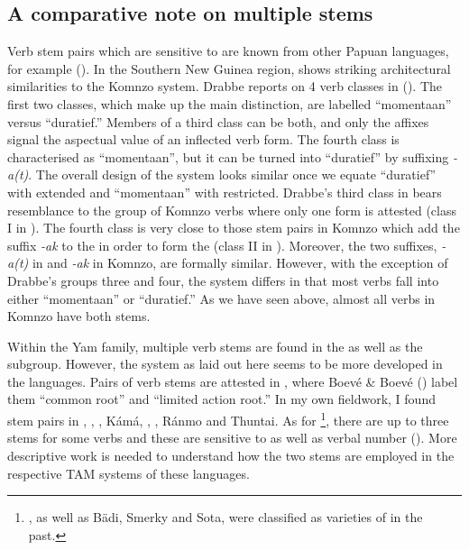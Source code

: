 \subsection{A comparative note on multiple stems} \label{comparativenoteextrs}

Verb stem pairs which are sensitive to  are known from other Papuan languages, for example  (\citealt[245]{Fedden:2011wu}). In the Southern New Guinea region,  shows striking architectural similarities to the Komnzo system. Drabbe reports on 4 verb classes in  (\citeyear[31]{Drabbe:1955tm}). The first two classes, which make up the main distinction, are labelled ``momentaan'' versus ``duratief.'' Members of a third class can be both, and only the affixes signal the aspectual value of an inflected verb form. The fourth class is characterised as ``momentaan'', but it can be turned into ``duratief'' by suffixing \emph{-a(t)}. The overall design of the  system looks similar once we equate ``duratief'' with extended and ``momentaan'' with restricted. Drabbe's third class in  bears resemblance to the group of Komnzo verbs where only one form is attested (class I in ). The fourth class is very close to those stem pairs in Komnzo which add the suffix \emph{-ak} to the  in order to form the  (class II in ). Moreover, the two suffixes, \emph{-a(t)} in  and \emph{-ak} in Komnzo, are formally similar. However, with the exception of Drabbe's groups three and four, the  system differs in that most verbs fall into either ``momentaan'' or ``duratief.'' As we have seen above, almost all verbs in Komnzo have both stems.

Within the Yam family, multiple verb stems are found in the  as well as the  subgroup. However, the system as laid out here seems to be more developed in the  languages. Pairs of verb stems are attested in , where Boevé \& Boevé (\citeyear{Bouve:2003ar}) label them ``common root'' and ``limited action root.'' In my own fieldwork, I found stem pairs in , , , Kámá, , , Ránmo and  Thuntai. As for \footnote{, as well as Bädi, Smerky and Sota, were classified as varieties of  in the past.}, there are up to three stems for some verbs and these are sensitive to  as well as verbal number (\citealt{Carroll:Ngkolmpu}). More descriptive work is needed to understand how the two stems are employed in the respective TAM systems of these languages.


